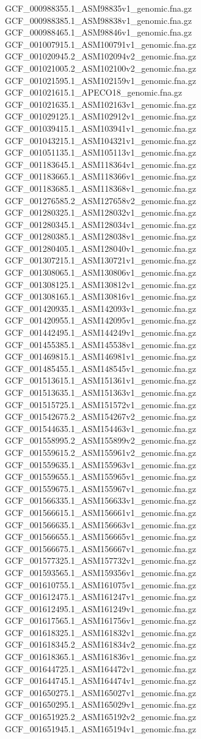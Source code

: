 \documentclass[12pt, letterpaper]{article}
\begin{document}
\begin{verbatim*}
GCF_000988355.1_ASM98835v1_genomic.fna.gz
GCF_000988385.1_ASM98838v1_genomic.fna.gz
GCF_000988465.1_ASM98846v1_genomic.fna.gz
GCF_001007915.1_ASM100791v1_genomic.fna.gz
GCF_001020945.2_ASM102094v2_genomic.fna.gz
GCF_001021005.2_ASM102100v2_genomic.fna.gz
GCF_001021595.1_ASM102159v1_genomic.fna.gz
GCF_001021615.1_APECO18_genomic.fna.gz
GCF_001021635.1_ASM102163v1_genomic.fna.gz
GCF_001029125.1_ASM102912v1_genomic.fna.gz
GCF_001039415.1_ASM103941v1_genomic.fna.gz
GCF_001043215.1_ASM104321v1_genomic.fna.gz
GCF_001051135.1_ASM105113v1_genomic.fna.gz
GCF_001183645.1_ASM118364v1_genomic.fna.gz
GCF_001183665.1_ASM118366v1_genomic.fna.gz
GCF_001183685.1_ASM118368v1_genomic.fna.gz
GCF_001276585.2_ASM127658v2_genomic.fna.gz
GCF_001280325.1_ASM128032v1_genomic.fna.gz
GCF_001280345.1_ASM128034v1_genomic.fna.gz
GCF_001280385.1_ASM128038v1_genomic.fna.gz
GCF_001280405.1_ASM128040v1_genomic.fna.gz
GCF_001307215.1_ASM130721v1_genomic.fna.gz
GCF_001308065.1_ASM130806v1_genomic.fna.gz
GCF_001308125.1_ASM130812v1_genomic.fna.gz
GCF_001308165.1_ASM130816v1_genomic.fna.gz
GCF_001420935.1_ASM142093v1_genomic.fna.gz
GCF_001420955.1_ASM142095v1_genomic.fna.gz
GCF_001442495.1_ASM144249v1_genomic.fna.gz
GCF_001455385.1_ASM145538v1_genomic.fna.gz
GCF_001469815.1_ASM146981v1_genomic.fna.gz
GCF_001485455.1_ASM148545v1_genomic.fna.gz
GCF_001513615.1_ASM151361v1_genomic.fna.gz
GCF_001513635.1_ASM151363v1_genomic.fna.gz
GCF_001515725.1_ASM151572v1_genomic.fna.gz
GCF_001542675.2_ASM154267v2_genomic.fna.gz
GCF_001544635.1_ASM154463v1_genomic.fna.gz
GCF_001558995.2_ASM155899v2_genomic.fna.gz
GCF_001559615.2_ASM155961v2_genomic.fna.gz
GCF_001559635.1_ASM155963v1_genomic.fna.gz
GCF_001559655.1_ASM155965v1_genomic.fna.gz
GCF_001559675.1_ASM155967v1_genomic.fna.gz
GCF_001566335.1_ASM156633v1_genomic.fna.gz
GCF_001566615.1_ASM156661v1_genomic.fna.gz
GCF_001566635.1_ASM156663v1_genomic.fna.gz
GCF_001566655.1_ASM156665v1_genomic.fna.gz
GCF_001566675.1_ASM156667v1_genomic.fna.gz
GCF_001577325.1_ASM157732v1_genomic.fna.gz
GCF_001593565.1_ASM159356v1_genomic.fna.gz
GCF_001610755.1_ASM161075v1_genomic.fna.gz
GCF_001612475.1_ASM161247v1_genomic.fna.gz
GCF_001612495.1_ASM161249v1_genomic.fna.gz
GCF_001617565.1_ASM161756v1_genomic.fna.gz
GCF_001618325.1_ASM161832v1_genomic.fna.gz
GCF_001618345.2_ASM161834v2_genomic.fna.gz
GCF_001618365.1_ASM161836v1_genomic.fna.gz
GCF_001644725.1_ASM164472v1_genomic.fna.gz
GCF_001644745.1_ASM164474v1_genomic.fna.gz
GCF_001650275.1_ASM165027v1_genomic.fna.gz
GCF_001650295.1_ASM165029v1_genomic.fna.gz
GCF_001651925.2_ASM165192v2_genomic.fna.gz
GCF_001651945.1_ASM165194v1_genomic.fna.gz

\end{verbatim*}
\end{document}
